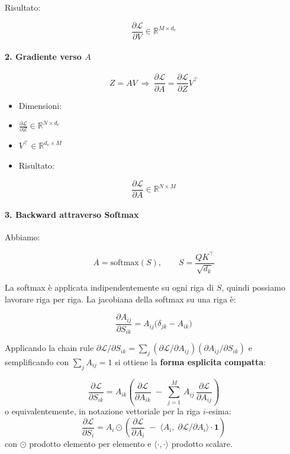\documentclass[
  11pt,
]{article}
\begin{document}
Risultato:

\[\frac{\partial\mathcal{L}}{\partial V} \in \mathbb{R}^{M \times d_{v}}\]

\paragraph{2. Gradiente verso $A$}

\[Z = AV\  \Rightarrow \ \frac{\partial\mathcal{L}}{\partial A} = \frac{\partial\mathcal{L}}{\partial Z}V^{\top}\]

\begin{itemize}
\item
  Dimensioni:
\item
  \(\frac{\partial\mathcal{L}}{\partial Z} \in \mathbb{R}^{N \times d_{v}}\)
\item
  \(V^{\top} \in \mathbb{R}^{d_{v} \times M}\)
\item
  Risultato:
\end{itemize}

\[\frac{\partial\mathcal{L}}{\partial A} \in \mathbb{R}^{N \times M}\]

\paragraph{3. Backward attraverso Softmax}

Abbiamo:

\[A = \text{softmax}(S), \qquad S = \frac{QK^{\top}}{\sqrt{d_k}}\]

La softmax è applicata indipendentemente su ogni riga di $S$, quindi possiamo lavorare riga per riga. La jacobiana della softmax su una riga è:

\[\frac{\partial A_{ij}}{\partial S_{ik}} = A_{ij}\bigl(\delta_{jk} - A_{ik}\bigr)\]

Applicando la chain rule $\partial \mathcal{L}/\partial S_{ik} = \sum_j (\partial \mathcal{L}/\partial A_{ij})(\partial A_{ij}/\partial S_{ik})$ e semplificando con $\sum_j A_{ij} = 1$ si ottiene la \textbf{forma esplicita compatta}:

\begin{formulabox}[title={\textbf{Softmax backward --- forma vettoriale per riga}}]
\[
\frac{\partial \mathcal{L}}{\partial S_{ik}} = A_{ik}\left(\frac{\partial \mathcal{L}}{\partial A_{ik}} \;-\; \sum_{j = 1}^{M}\, A_{ij}\,\frac{\partial \mathcal{L}}{\partial A_{ij}}\right)
\]
o equivalentemente, in notazione vettoriale per la riga $i$-esima:
\[
\frac{\partial \mathcal{L}}{\partial S_i} = A_i \odot \left(\frac{\partial \mathcal{L}}{\partial A_i} \;-\; \langle A_i,\; \partial \mathcal{L}/\partial A_i \rangle \cdot \mathbf{1}\right)
\]
con $\odot$ prodotto elemento per elemento e $\langle \cdot, \cdot \rangle$ prodotto scalare.
\end{formulabox}
\end{document}
